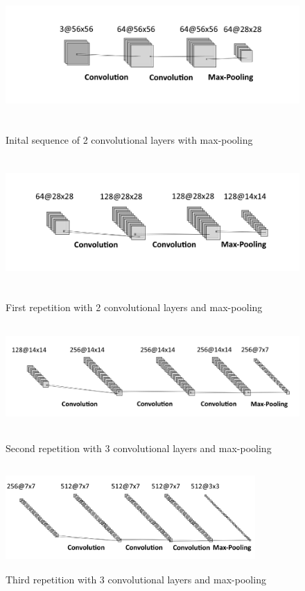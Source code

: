\documentclass{tubaf-article}
\begin{document}
	\begin{figure}[htp]
		\centering
		\begin{minipage}{\textwidth}
			\centering
			\includegraphics[width=\textwidth, height=5cm]{final1.png}
			\caption{Inital sequence of 2 convolutional layers with max-pooling}
		\end{minipage}
		
		\begin{minipage}{\textwidth}
			\centering
			\includegraphics[width=\textwidth, height=5cm]{final2.png}
			\caption{First repetition with 2 convolutional layers and max-pooling}
		\end{minipage}
		
		\begin{minipage}{\textwidth}
			\centering
			\includegraphics[width=\textwidth, height=4cm]{final3.png}
			\caption{Second repetition with 3 convolutional layers and max-pooling}
		\end{minipage}
		
		\begin{minipage}{\textwidth}
			\centering
			\includegraphics[width=0.85\textwidth, height=4cm]{final4.png}
			\caption{Third repetition with 3 convolutional layers and max-pooling}
		\end{minipage}
		
	\end{figure}
\end{document}
